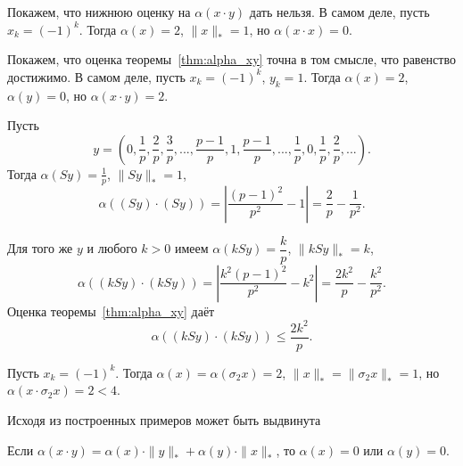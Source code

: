 \begin{example}
	Покажем, что нижнюю оценку на $\alpha(x\cdot y)$ дать нельзя.
	В самом деле,
	пусть $x_k = (-1)^k$.
	Тогда $\alpha(x) = 2$, $\|x\|_* = 1$,
	но $\alpha(x\cdot x) = 0$.
\end{example}

\begin{example}
	\label{ex:alpha-c_not_ideal}
	Покажем, что оценка теоремы~\ref{thm:alpha_xy} точна в том смысле,
	что равенство достижимо.
	В самом деле,
	пусть $x_k = (-1)^k$, $y_k = 1$.
	Тогда $\alpha(x) = 2$, $\alpha(y) = 0$,
	но $\alpha(x\cdot y) = 2$.
\end{example}

\begin{example}
	Пусть
	\begin{equation}
		y = \left(
			0, \frac{1}{p}, \frac{2}{p}, \frac{3}{p},
			...,
			\frac{p-1}{p}, 1, \frac{p-1}{p},
			...,
			\frac{1}{p},
			0,
			\frac{1}{p}, \frac{2}{p}, ...
		\right)
		.
	\end{equation}
	Тогда $\alpha(Sy) = \frac{1}{p}$, $\|Sy\|_* = 1$,
	\begin{equation}
		\alpha((Sy)\cdot(Sy)) =
		\left| \frac{(p-1)^2}{p^2} - 1 \right| =
		\frac{2}{p}-\frac{1}{p^2}
		.
	\end{equation}
\end{example}

\begin{example}
	Для того же $y$ и любого $k>0$ имеем
	$\alpha(kSy) = \dfrac{k}{p}$, $\|kSy\|_* = k$,
	\begin{equation}
		\alpha((kSy)\cdot(kSy)) =
		\left| \frac{k^2(p-1)^2}{p^2} - k^2 \right| =
		\frac{2k^2}{p}-\frac{k^2}{p^2}
		.
	\end{equation}
	Оценка теоремы~\ref{thm:alpha_xy} даёт
	\begin{equation}
		\alpha((kSy)\cdot(kSy)) \leq
		\frac{2k^2}{p}
		.
	\end{equation}
\end{example}



\begin{example}
	Пусть $x_k = (-1)^k$.
	Тогда $\alpha(x) = \alpha(\sigma_2 x) = 2$, $\|x\|_* = \|\sigma_2 x\|_* = 1$,
	но $\alpha(x\cdot \sigma_2 x) = 2 < 4$.
\end{example}

Исходя из построенных примеров может быть выдвинута
\begin{hypothesis}
	Если $\alpha(x\cdot y)= \alpha(x)\cdot \|y\|_* + \alpha(y)\cdot \|x\|_*$,
	то $\alpha(x) = 0$ или $\alpha(y) = 0$.
\end{hypothesis}
